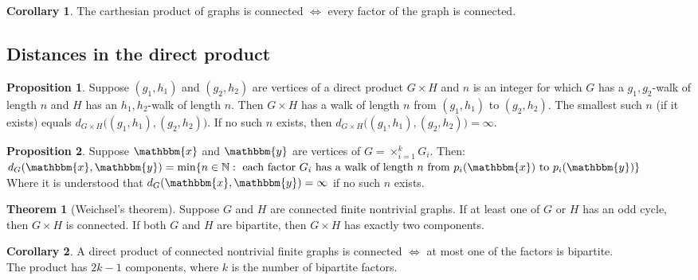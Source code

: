 \documentclass{article}
\theoremstyle{definition}
\newtheorem{theorem}{Theorem}[section]
\newtheorem{corollary}{Corollary}[section]
\newtheorem{prop}{Proposition}[section]
\begin{document}
\begin{corollary}
    The carthesian product of graphs is connected $\iff$ every factor of the graph is connected.
\end{corollary}

\subsection{Distances in the direct product}

\begin{prop}
    Suppose $(g_1, h_1)$ and $(g_2, h_2)$ are vertices of a direct product $G \times H$ and $n$ is an integer for which $G$ has a $g_1,g_2$-walk of length $n$ and $H$ has an $h_1,h_2$-walk of length $n$. Then $G \times H$ has a walk of length $n$ from $(g_1, h_1)$ to $(g_2, h_2)$. The smallest such $n$ (if it exists) equals $d_{G \times H}\bigl((g_1, h_1), (g_2, h_2)\bigr)$. If no such $n$ exists, then $d_{G \times H}\bigl((g_1, h_1), (g_2, h_2)\bigr) = \infty$.
\end{prop}

\begin{prop}
    Suppose $\mathbbm{x}$ and $\mathbbm{y}$ are vertices of $G = \times_{i = 1}^k G_i$. Then: \\
    $d_G(\mathbbm{x}, \mathbbm{y}) = \min\{n \in \mathbb{N}:\ \text{each factor } G_i \text{ has a walk of length } n \text{ from } p_i(\mathbbm{x}) \text{ to } p_i(\mathbbm{y})\}$ \\
    Where it is understood that $d_G(\mathbbm{x}, \mathbbm{y}) = \infty$ if no such $n$ exists.
\end{prop}

\begin{theorem}[Weichsel's theorem]
    Suppose $G$ and $H$ are connected finite nontrivial graphs. If at least one of $G$ or $H$ has an odd cycle, then $G \times H$ is connected. If both $G$ and $H$ are bipartite, then $G \times H$ has exactly two components.
\end{theorem}

\begin{corollary}
    A direct product of connected nontrivial finite graphs is connected $\iff$ at most one of the factors is bipartite. \\
    The product has $2k - 1$ components, where $k$ is the number of bipartite factors.
\end{corollary}
\end{document}
